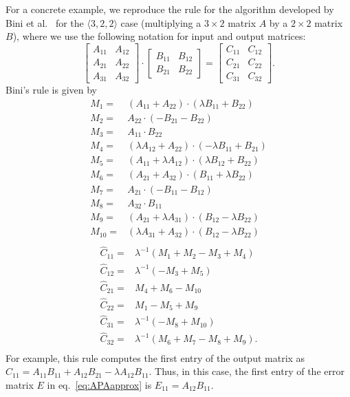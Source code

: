 \documentclass[manuscript]{acmart}
\newcommand{\dims}[1]{\langle #1 \rangle}
\begin{document}
For a concrete example, we reproduce the rule for the algorithm developed by Bini et al.~\cite{BCRL79} for the $\dims{3,2,2}$ case (multiplying a $3\times 2$ matrix $A$ by a $2\times 2$ matrix $B$), where we use the following notation for input and output matrices:
$$
\begin{bmatrix} A_{11} & A_{12} \\ A_{21} & A_{22} \\ A_{31} & A_{32}  \end{bmatrix} \cdot
\begin{bmatrix} B_{11} & B_{12} \\ B_{21} & B_{22} \end{bmatrix}=
\begin{bmatrix} C_{11} & C_{12} \\ C_{21} & C_{22} \\ C_{31} & C_{32} \end{bmatrix} .$$
Bini's rule is given by
\begin{align*}
M_1 =& (A_{11} + A_{22}) \cdot (\lambda B_{11} + B_{22}) \\
M_2 =& A_{22}\cdot  (-B_{21} - B_{22}) \\
M_3 =& A_{11}\cdot B_{22} \\
M_4 =& (\lambda A_{12} + A_{22})\cdot (-\lambda B_{11} + B_{21}) \\
M_5 =& (A_{11} + \lambda A_{12}) \cdot (\lambda B_{12} + B_{22}) \\
M_6 =& (A_{21} + A_{32}) \cdot (B_{11} + \lambda B_{22}) \\
M_7 =& A_{21} \cdot (-B_{11} - B_{12}) \\
M_8 =& A_{32} \cdot B_{11}\\
M_9 =& (A_{21} + \lambda A_{31}) \cdot (B_{12} - \lambda B_{22})\\
M_{10} =& (\lambda A_{31} + A_{32}) \cdot (B_{12} - \lambda B_{22})\\
\end{align*}
\begin{align*}
\hat C_{11} =& \lambda^{-1} (M_1 + M_2 - M_3 + M_4) \\
\hat C_{12} =& \lambda^{-1} (-M_3 + M_5) \\
\hat C_{21} =& M_4 + M_6 - M_{10}\\
\hat C_{22} =& M_1 - M_5 + M_9\\
\hat C_{31} =& \lambda^{-1} (-M_8 + M_{10}) \\
\hat C_{32} =& \lambda^{-1} (M_6 + M_7 - M_8 + M_9).\\
\end{align*}
For example, this rule computes the first entry of the output matrix as $\hat C_{11} = A_{11}  B_{11} + A_{12}  B_{21} - \lambda A_{12}  B_{11}$.
Thus, in this case, the first entry of the error matrix $E$ in eq.~\eqref{eq:APAapprox} is $E_{11} = A_{12}  B_{11}$.
\end{document}

